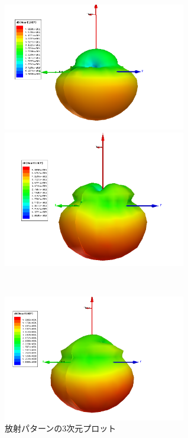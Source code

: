 \documentclass[11pt,a4paper,uplatex]{ujarticle}
\begin{document}
  \clearpage
  \begin{figure}[tbp]
    \begin{minipage}[b]{0.49\textwidth}
      \centering
      \includegraphics[keepaspectratio, width=80mm]{Images/near_E_2GHz.png}
    \end{minipage}
    \begin{minipage}[b]{0.49\textwidth}
      \centering
      \includegraphics[keepaspectratio, width=80mm]{Images/near_E_5GHz.png}
    \end{minipage}\\
    \begin{minipage}[b]{0.49\textwidth}
      \centering
      \includegraphics[keepaspectratio, width=80mm]{Images/near_E_10GHz.png}
    \end{minipage}
    \caption{放射パターンの3次元プロット}\label{fig:radiation_pattern_3D}
  \end{figure}
\end{document}
